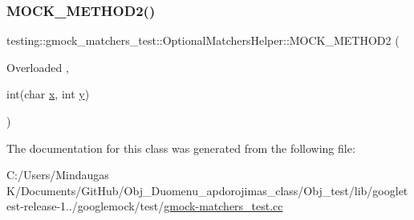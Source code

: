 \mbox{\label{classtesting_1_1gmock__matchers__test_1_1_optional_matchers_helper_a2051b793f9f68027e8861ec999739b9a}} 
\subsubsection{\texorpdfstring{MOCK\_METHOD2()}{MOCK\_METHOD2()}\hspace{0.1cm}{\footnotesize\ttfamily [2/2]}}
{\footnotesize\ttfamily testing\+::gmock\+\_\+matchers\+\_\+test\+::\+Optional\+Matchers\+Helper\+::\+M\+O\+C\+K\+\_\+\+M\+E\+T\+H\+O\+D2 (\begin{DoxyParamCaption}\item[{Overloaded}]{,  }\item[{int(char \mbox{\hyperlink{_obj__test_2lib_2googletest-master_2googlemock_2test_2gmock-matchers__test_8cc_a6150e0515f7202e2fb518f7206ed97dc}{x}}, int \mbox{\hyperlink{_obj__test_2lib_2googletest-master_2googlemock_2test_2gmock-matchers__test_8cc_a39cb44155237f0205e0feb931d5acbed}{y}})}]{ }\end{DoxyParamCaption})}



The documentation for this class was generated from the following file\+:\begin{DoxyCompactItemize}
\item 
C\+:/\+Users/\+Mindaugas K/\+Documents/\+Git\+Hub/\+Obj\+\_\+\+Duomenu\+\_\+apdorojimas\+\_\+class/\+Obj\+\_\+test/lib/googletest-\/release-\/1../googlemock/test/\mbox{\hyperlink{_obj__test_2lib_2googletest-release-1_88_81_2googlemock_2test_2gmock-matchers__test_8cc}{gmock-\/matchers\+\_\+test.\+cc}}\end{DoxyCompactItemize}
